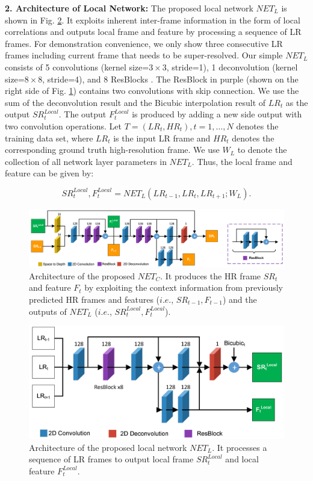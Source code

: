 \documentclass[letterpaper]{article} %
\begin{document}
\textbf{2. Architecture of Local Network:} The proposed local network $NET_L$ is shown in Fig. \ref{figureLocalNetwork}. It exploits inherent inter-frame information in the form of local correlations and outputs local frame and feature by processing a sequence of LR frames. For demonstration convenience, we only show three consecutive LR frames including current frame that needs to be super-resolved. Our simple $NET_L$ consists of 5 convolutions (kernel size=$3\times3$, stride=1), 1 deconvolution (kernel size=$8\times8$, stride=4), and 8 ResBlocks \cite{Lim2017Enhanced}. The ResBlock in purple (shown on the right side of Fig. \ref{figureContextNetwork}) contains two convolutions with skip connection. We use the sum of the deconvolution result and the Bicubic interpolation result of $LR_t$ as the output $SR^{Local}_t$. The output $F^{Local}_t$ is produced by adding a new side output with two convolution operations. Let $T = {(LR_t, HR_t), t=1,\dotsc, N}$ denotes the training data set, where $LR_t$ is the input LR frame and $HR_t$ denotes the corresponding ground truth high-resolution frame. We use $W_L$ to denote the collection of all network layer parameters in $NET_L$. Thus, the local frame and feature can be given by:


\begin{equation}
  SR^{Local}_t, F^{Local}_t = NET_L(LR_{t-1}, LR_t, LR_{t+1}; W_L).
  \label{equationLocalNetwork}
\end{equation}




\begin{figure}[t]
\centering
\includegraphics[width=17.5 cm]{Fig5.png}
\caption{Architecture of the proposed $NET_C$. It produces the HR frame $SR_t$ and feature $F_t$ by exploiting the context information from previously predicted HR frames and features ($i.e.$, $SR_{t-1}, F_{t-1}$) and the outputs of $NET_L$ ($i.e.$, $SR^{Local}_t, F^{Local}_t$).}
\label{figureContextNetwork}
\end{figure}



\begin{figure}[t]
\centering
\includegraphics[width=8.5 cm]{Fig4.png}
\caption{Architecture of the proposed local network $NET_L$. It processes a sequence of LR frames to output local frame $SR^{Local}_t$ and local feature $F^{Local}_t$.}
\label{figureLocalNetwork}
\end{figure}
\end{document}
